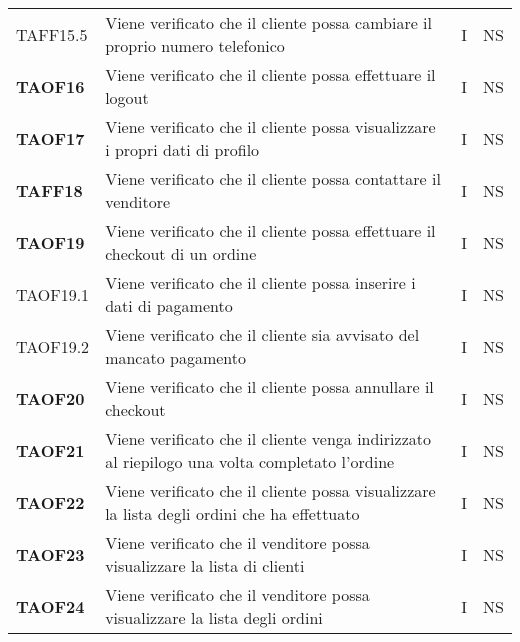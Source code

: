 \begin{center}
\begin{longtable}[!h]{p{60px} p{240px} p{35px} p{35px}}
        TAFF15.5        & Viene verificato che il cliente possa cambiare il proprio numero telefonico                                          & I             & NS              \\
        \textbf{TAOF16} & Viene verificato che il cliente possa effettuare il logout                                                           & I             & NS              \\
        \textbf{TAOF17} & Viene verificato che il cliente possa visualizzare i propri dati di profilo                                          & I             & NS              \\
        \textbf{TAFF18} & Viene verificato che il cliente possa contattare il venditore                                                        & I             & NS              \\
        \textbf{TAOF19} & Viene verificato che il cliente possa effettuare il checkout di un ordine                                            & I             & NS              \\
        TAOF19.1        & Viene verificato che il cliente possa inserire i dati di pagamento                                                   & I             & NS              \\
        TAOF19.2        & Viene verificato che il cliente sia avvisato del mancato pagamento                                                   & I             & NS              \\
        \textbf{TAOF20} & Viene verificato che il cliente possa annullare il checkout                                                          & I             & NS              \\
        \textbf{TAOF21} & Viene verificato che il cliente venga indirizzato al riepilogo una volta completato l'ordine                         & I             & NS              \\
        \textbf{TAOF22} & Viene verificato che il cliente possa visualizzare la lista degli ordini che ha effettuato                           & I             & NS              \\
        \textbf{TAOF23} & Viene verificato che il venditore possa visualizzare la lista di clienti                                             & I             & NS              \\
        \textbf{TAOF24} & Viene verificato che il venditore possa visualizzare la lista degli ordini                                           & I             & NS              \\

\end{longtable}
\end{center}
